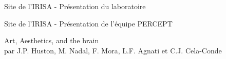 
\begin{thebibliography}{99}

	  Site de l'IRISA - Présentation du laboratoire\\
      
	  Site de l'IRISA - Présentation de l'équipe PERCEPT\\

      Art, Aesthetics, and the brain\\
      par J.P. Huston, M. Nadal, F. Mora, L.F. Agnati et C.J. Cela-Conde

\end{thebibliography}

